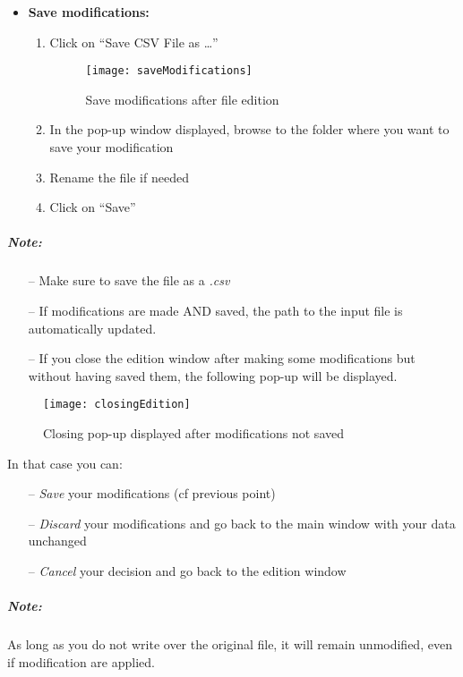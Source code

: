 \documentclass[fadttsterUserGuide_use]{subfiles}
\begin{document}
	\begin{itemize}
		\item \textbf{Save modifications:}
		\begin{enumerate}
			\item Click on ``Save CSV File as \ldots''
			\begin{figure}[H]
  				\texttt{[image: saveModifications]}
  				\caption{Save modifications after file edition}
    			\label{fig:saveModifications}
			\end{figure}
			\item In the pop-up window displayed, browse to the folder where you want to save your modification
			\item Rename the file if needed
			\item Click on ``Save''
		\end{enumerate}
	\end{itemize}
	\subparagraph{\textbf{Note:}}
	\begin{itemize}
		\item[--] Make sure to save the file as a \textit{.csv}
		\item[--] If modifications are made AND saved, the path to the input file is automatically updated.
		\item[--] If you close the edition window after making some modifications but without having saved them, the following pop-up will be displayed.
	\end{itemize}
	\begin{figure}[H]
  		\texttt{[image: closingEdition]}
  		\caption{Closing pop-up displayed after modifications not saved}
    	\label{fig:editionWindow_closingPopUp}
	\end{figure}
	\vfill
	\newpage
	
	In that case you can:
	\begin{itemize}
		\setlength\itemindent{25pt}
		\item[--] \textit{Save} your modifications (cf previous point)
		\item[--] \textit{Discard} your modifications and go back to the main window with your data unchanged
		\item[--] \textit{Cancel} your decision and go back to the edition window
	\end{itemize}
	\subparagraph{\textbf{Note:}} As long as you do not write over the original file, it will remain unmodified, even if modification are applied.
	
	
\end{document}
